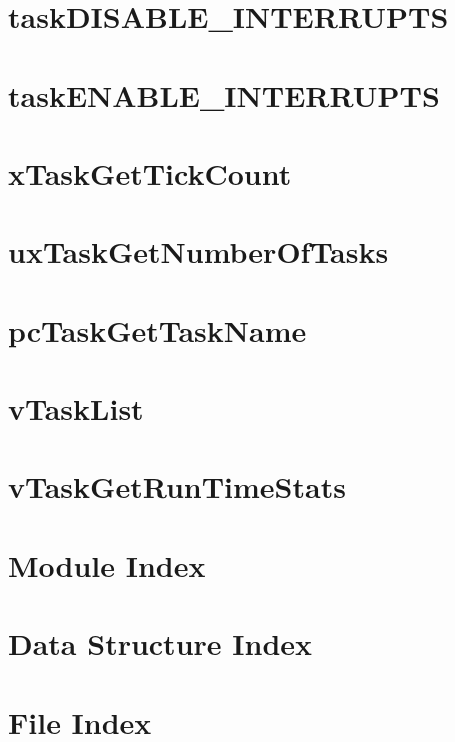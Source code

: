 \documentclass{book}
\begin{document}
\chapter{task\-D\-I\-S\-A\-B\-L\-E\-\_\-\-I\-N\-T\-E\-R\-R\-U\-P\-T\-S}
\label{taskDISABLE_INTERRUPTS}
\hypertarget{taskDISABLE_INTERRUPTS}{}

\chapter{task\-E\-N\-A\-B\-L\-E\-\_\-\-I\-N\-T\-E\-R\-R\-U\-P\-T\-S}
\label{taskENABLE_INTERRUPTS}
\hypertarget{taskENABLE_INTERRUPTS}{}

\chapter{x\-Task\-Get\-Tick\-Count}
\label{xTaskGetTickCount}
\hypertarget{xTaskGetTickCount}{}

\chapter{ux\-Task\-Get\-Number\-Of\-Tasks}
\label{uxTaskGetNumberOfTasks}
\hypertarget{uxTaskGetNumberOfTasks}{}

\chapter{pc\-Task\-Get\-Task\-Name}
\label{pcTaskGetTaskName}
\hypertarget{pcTaskGetTaskName}{}

\chapter{v\-Task\-List}
\label{vTaskList}
\hypertarget{vTaskList}{}

\chapter{v\-Task\-Get\-Run\-Time\-Stats}
\label{vTaskGetRunTimeStats}
\hypertarget{vTaskGetRunTimeStats}{}

\chapter{Module Index}

\chapter{Data Structure Index}

\chapter{File Index}

\end{document}
